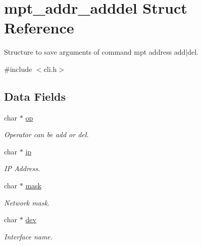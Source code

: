 \hypertarget{structmpt__addr__adddel}{\section{mpt\-\_\-addr\-\_\-adddel Struct Reference}
\label{structmpt__addr__adddel}
}


Structure to save arguments of command mpt address add$|$del.  




{\ttfamily \#include $<$cli.\-h$>$}

\subsection*{Data Fields}
\begin{DoxyCompactItemize}
\item 
\hypertarget{structmpt__addr__adddel_a15206368e0a18f984f0ad6cb10c2995e}{char $\ast$ \hyperlink{structmpt__addr__adddel_a15206368e0a18f984f0ad6cb10c2995e}{op}}\label{structmpt__addr__adddel_a15206368e0a18f984f0ad6cb10c2995e}

\begin{DoxyCompactList}\small\item\em Operator can be add or del. \end{DoxyCompactList}\item 
\hypertarget{structmpt__addr__adddel_afbc356cd0e25d1dbbece7c10fd025fa6}{char $\ast$ \hyperlink{structmpt__addr__adddel_afbc356cd0e25d1dbbece7c10fd025fa6}{ip}}\label{structmpt__addr__adddel_afbc356cd0e25d1dbbece7c10fd025fa6}

\begin{DoxyCompactList}\small\item\em I\-P Address. \end{DoxyCompactList}\item 
\hypertarget{structmpt__addr__adddel_acd90c48c0e60103e7db2ebddc2753d12}{char $\ast$ \hyperlink{structmpt__addr__adddel_acd90c48c0e60103e7db2ebddc2753d12}{mask}}\label{structmpt__addr__adddel_acd90c48c0e60103e7db2ebddc2753d12}

\begin{DoxyCompactList}\small\item\em Network mask. \end{DoxyCompactList}\item 
\hypertarget{structmpt__addr__adddel_abe78755474c1323a5ac7b3dd6d03dedf}{char $\ast$ \hyperlink{structmpt__addr__adddel_abe78755474c1323a5ac7b3dd6d03dedf}{dev}}\label{structmpt__addr__adddel_abe78755474c1323a5ac7b3dd6d03dedf}

\begin{DoxyCompactList}\small\item\em Interface name. \end{DoxyCompactList}\end{DoxyCompactItemize}


